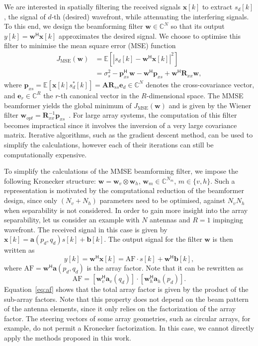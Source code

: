 \documentclass{cta-author}
\newcommand{\bmm}[1]{\ensuremath{\mathbb{#1}}}				%
\newcommand{\hermit}{\mathsf{H}}					%
\newcommand{\Rss}{\bm{R}_{ss}}
\newcommand{\Rxx}{\bm{R}_{xx}}
\newcommand{\pxs}{\bm{p}_{xs}}
\begin{document}
We are interested in spatially filtering the received signals $\bm{x}[k]$ to extract $s_d[k]$, the signal of $d$-th (desired) wavefront, while attenuating the interfering signals. To this end, we design the beamforming filter $\bm{w} \in \bmm{C}^{N}$ so that its output  $y[k]=\bm{w}^\hermit \bm{x}[k]$ approximates the desired signal.
We choose to optimise this filter to minimise the mean square error (MSE) function
\begin{align} \label{eq:msefunc}
J_\text{MSE}(\bm{w}) &= \bmm{E}\left[|s_d[k] - \bm{w}^\hermit \bm{x}[k]|^2 \right] \\
			         &= \sigma_s^2 - \pxs^\hermit \bm{w} - \bm{w}^\hermit \pxs + \bm{w}^\hermit \Rxx \bm{w},
\end{align}
where $\pxs = \bmm{E}\left[ \bm{x}[k] s_d^*[k] \right] = \bm{A} \Rss \bm{e}_{d} \in \bmm{C}^{N}$ denotes the cross-covariance vector, and $\bm{e}_{r} \in \bmm{C}^{R}$ the $r$-th canonical vector in the $R$-dimensional space. The MMSE beamformer yields the global minimum of $J_\textrm{MSE}(\bm{w})$ and is given by the Wiener filter $\bm{w}_{opt} = \Rxx^{-1} \pxs$~\cite{haykin_adaptive_1996}. For large array systems, the computation of this filter becomes impractical since it involves the inversion of a very large covariance matrix. Iterative algorithms, such as the gradient descent method, can be used to simplify the calculations, however each of their iterations can still be computationally expensive. 

To simplify the calculations of the MMSE beamforming filter, we impose the following Kronecker structure: $\bm{w} = \bm{w}_v \otimes \bm{w}_h$, $\bm{w}_m \in \bmm{C}^{N_m}$, $m \in \{v,h\}$. Such a representation is motivated by the computational reduction of the beamformer design, since only $(N_v + N_h)$ parameters need to be optimised, against $N_v N_h$ when separability is not considered. In order to gain more insight into the array separability, let us consider an example with $N$ antennas and $R=1$ impinging wavefront. The received signal in this case is given by $\bm{x}[k] = \bm{a}(p_d,q_d)s[k] + \bm{b}[k]$. The output signal for the filter $\bm{w}$ is then written as
\begin{equation}
	y[k] = \bm{w}^\hermit \bm{x}[k] = \text{AF} \cdot  s[k] + \bm{w}^\hermit \bm{b}[k],
\end{equation} 
where $\text{AF} = \bm{w}^\hermit \bm{a}(p_d,q_d)$ is the array factor. Note that it can be rewritten as
\begin{equation}
	\text{AF} = \left[ \bm{w}_v^\hermit \bm{a}_v(q_d) \right] \cdot \left[ \bm{w}_h^\hermit \bm{a}_h(p_d) \right]. \label{eq:af}
\end{equation}
Equation~\eqref{eq:af} shows that the total array factor is given by the product of the sub-array factors. Note that this property does not depend on the beam pattern of the antenna elements, since it only relies on the factorization of the array factor. The steering vectors of some array geometries, such as circular arrays, for example, do not permit a Kronecker factorization. In this case, we cannot directly apply the methods proposed in this work.
\end{document}

